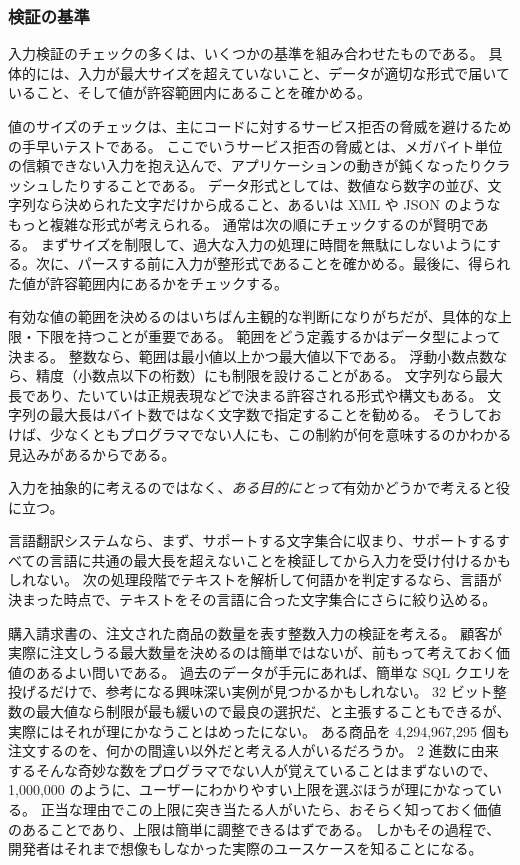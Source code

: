 \documentclass[uplatex]{jsarticle}
\def\label#1{}%
\begin{document}
\subsubsection{検証の基準}

入力検証のチェックの多くは、いくつかの基準を組み合わせたものである。
具体的には、入力が最大サイズを超えていないこと、データが適切な形式で届いていること、そして値が許容範囲内にあることを確かめる。

値のサイズのチェックは、主にコードに対するサービス拒否の脅威を避けるための手早いテストである。
ここでいうサービス拒否の脅威とは、メガバイト単位の信頼できない入力を抱え込んで、アプリケーションの動きが鈍くなったりクラッシュしたりすることである。
データ形式としては、数値なら数字の並び、文字列なら決められた文字だけから成ること、あるいは XML や JSON のようなもっと複雑な形式が考えられる。
通常は次の順にチェックするのが賢明である。
まずサイズを制限して、過大な入力の処理に時間を無駄にしないようにする。次に、パースする前に入力が整形式であることを確かめる。最後に、得られた値が許容範囲内にあるかをチェックする。

有効な値の範囲を決めるのはいちばん主観的な判断になりがちだが、具体的な上限・下限を持つことが重要である。
範囲をどう定義するかはデータ型によって決まる。
整数なら、範囲は最小値以上かつ最大値以下である。
浮動小数点数なら、精度（小数点以下の桁数）にも制限を設けることがある。
文字列なら最大長であり、たいていは正規表現などで決まる許容される形式や構文もある。
文字列の最大長はバイト数ではなく文字数で指定することを勧める。
そうしておけば、少なくともプログラマでない人にも、この制約が何を意味するのかわかる見込みがあるからである。

入力を抽象的に考えるのではなく、\emph{ある目的にとって}有効かどうかで考えると役に立つ。

\begin{exa}[言語翻訳システムの段階的な検証]\label{exa:ch10-translation-validation}
言語翻訳システムなら、まず、サポートする文字集合に収まり、サポートするすべての言語に共通の最大長を超えないことを検証してから入力を受け付けるかもしれない。
次の処理段階でテキストを解析して何語かを判定するなら、言語が決まった時点で、テキストをその言語に合った文字集合にさらに絞り込める。
\end{exa}

\begin{exa}[注文数量の上限]\label{exa:ch10-order-quantity}
購入請求書の、注文された商品の数量を表す整数入力の検証を考える。
顧客が実際に注文しうる最大数量を決めるのは簡単ではないが、前もって考えておく価値のあるよい問いである。
過去のデータが手元にあれば、簡単な SQL クエリを投げるだけで、参考になる興味深い実例が見つかるかもしれない。
32 ビット整数の最大値なら制限が最も緩いので最良の選択だ、と主張することもできるが、実際にはそれが理にかなうことはめったにない。
ある商品を 4,294,967,295 個も注文するのを、何かの間違い以外だと考える人がいるだろうか。
2 進数に由来するそんな奇妙な数をプログラマでない人が覚えていることはまずないので、1,000,000 のように、ユーザーにわかりやすい上限を選ぶほうが理にかなっている。
正当な理由でこの上限に突き当たる人がいたら、おそらく知っておく価値のあることであり、上限は簡単に調整できるはずである。
しかもその過程で、開発者はそれまで想像もしなかった実際のユースケースを知ることになる。
\end{exa}
\end{document}
